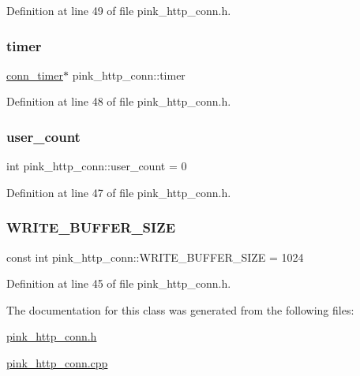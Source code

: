 Definition at line 49 of file pink\+\_\+http\+\_\+conn.\+h.

\mbox{\label{classpink__http__conn_a0b34c6a8a6b8f65fa882adb109990e43}} 
\subsubsection{\texorpdfstring{timer}{timer}}
{\footnotesize\ttfamily \hyperlink{classconn__timer}{conn\+\_\+timer}$\ast$ pink\+\_\+http\+\_\+conn\+::timer}



Definition at line 48 of file pink\+\_\+http\+\_\+conn.\+h.

\mbox{\label{classpink__http__conn_a4796952e9f7dc2a940e5681bc8f04139}} 
\subsubsection{\texorpdfstring{user\+\_\+count}{user\_count}}
{\footnotesize\ttfamily int pink\+\_\+http\+\_\+conn\+::user\+\_\+count = 0\hspace{0.3cm}{\ttfamily [static]}}



Definition at line 47 of file pink\+\_\+http\+\_\+conn.\+h.

\mbox{\label{classpink__http__conn_a7764e0564be1e1ae66c44cf34550efea}} 
\subsubsection{\texorpdfstring{W\+R\+I\+T\+E\+\_\+\+B\+U\+F\+F\+E\+R\+\_\+\+S\+I\+ZE}{WRITE\_BUFFER\_SIZE}}
{\footnotesize\ttfamily const int pink\+\_\+http\+\_\+conn\+::\+W\+R\+I\+T\+E\+\_\+\+B\+U\+F\+F\+E\+R\+\_\+\+S\+I\+ZE = 1024\hspace{0.3cm}{\ttfamily [static]}}



Definition at line 45 of file pink\+\_\+http\+\_\+conn.\+h.



The documentation for this class was generated from the following files\+:\begin{DoxyCompactItemize}
\item 
\hyperlink{pink__http__conn_8h}{pink\+\_\+http\+\_\+conn.\+h}\item 
\hyperlink{pink__http__conn_8cpp}{pink\+\_\+http\+\_\+conn.\+cpp}\end{DoxyCompactItemize}
